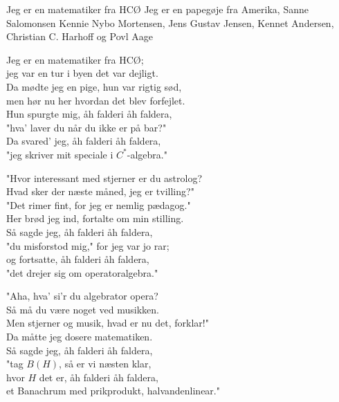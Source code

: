 \begin{song}{Jeg er en matematiker fra HCØ}
  {} %
  {Jeg er en papegøje fra Amerika, Sanne Salomonsen} %
  {Kennie Nybo Mortensen, Jens Gustav Jensen, Kennet Andersen, Christian C. Harhoff og Povl Aage} %
  {} %
  {\NotCCLIed} %

  \begin{SBVerse}
    Jeg er en matematiker fra HCØ;\\
    jeg var en tur i byen det var dejligt.\\
    Da mødte jeg en pige, hun var rigtig sød,\\
    men hør nu her hvordan det blev forfejlet.\\\medskip
    Hun spurgte mig, åh falderi åh faldera,\\
    "hva' laver du når du ikke er på bar?"\\
    Da svared' jeg, åh falderi åh faldera,\\
    "jeg skriver mit speciale i $C^*$-algebra."
  \end{SBVerse}

  \begin{SBVerse}
    "Hvor interessant med stjerner er du astrolog?\\
    Hvad sker der næste måned, jeg er tvilling?"\\
    "Det rimer fint, for jeg er nemlig pædagog."\\
    Her brød jeg ind, fortalte om min stilling.\\\medskip
    Så sagde jeg, åh falderi åh faldera,\\
    "du misforstod mig," for jeg var jo rar;\\
    og fortsatte, åh falderi åh faldera,\\
    "det drejer sig om operatoralgebra."
  \end{SBVerse}

  \begin{SBVerse}
    "Aha, hva' si’r du algebrator opera?\\
    Så må du være noget ved musikken.\\
    Men stjerner og musik, hvad er nu det, forklar!"\\
    Da måtte jeg dosere matematiken.\\\medskip
    Så sagde jeg, åh falderi åh faldera,\\
    "tag $B(H)$, så er vi næsten klar,\\
    hvor $H$ det er, åh falderi åh faldera,\\
    et Banachrum med prikprodukt, halvandenlinear."
  \end{SBVerse}


\end{song}
